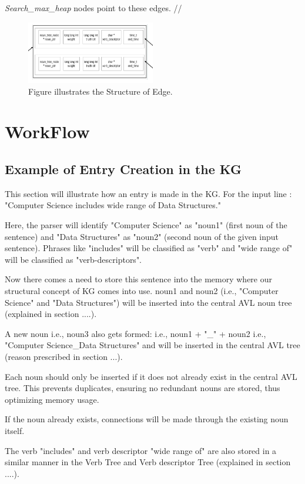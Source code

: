 \documentclass[conference]{IEEEtran}
\begin{document}
\textit{Search\_max\_heap} nodes point to these edges.
//
\begin{figure}[htbp]
\centerline{\includegraphics[width=0.5\textwidth]{fig_4_2.png}}
\caption{Figure illustrates the Structure of Edge.}
\label{fig}
\end{figure}



\section{WorkFlow}
\subsection{Example of Entry Creation in the KG}

This section will illustrate how an entry is made in the KG.
For the input line : "Computer Science includes wide range of
Data Structures."

Here, the parser will identify "Computer Science" as "noun1" (first noun of the sentence)
and "Data Structures" as "noun2" (second noun of the given input sentence).
Phrases like "includes" will be classified as "verb" and "wide range of" will be classified as "verb-descriptors".

Now there comes a need to store this sentence into the memory where our structural concept
of KG comes into use.
noun1 and noun2 (i.e., "Computer Science" and "Data Structures") will be inserted into the central AVL noun
tree (explained in section ....).

A new noun i.e., noun3 also gets formed: i.e., noun1 + "\_" + noun2 i.e., "Computer Science\_Data Structures"
and will be inserted in the central AVL tree (reason prescribed in section ...).

Each noun should only be inserted if it does not already exist in the central AVL tree. 
This prevents duplicates, ensuring no redundant nouns are stored, thus optimizing memory usage.

If the noun already exists, connections will be made through the existing noun itself.

The verb "includes" and verb descriptor "wide range of" are also stored in a similar manner
in the Verb Tree and Verb descriptor Tree (explained in section ....).
\end{document}
